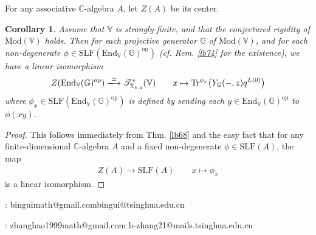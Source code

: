 \documentclass[11pt,b5paper,notitlepage]{article}
\theoremstyle{definition}
\theoremstyle{plain}
\newtheorem{co}[df]{Corollary}
\newcommand{\fk}{\mathfrak}
\newcommand{\Tr}{\mathrm{Tr}}
\newcommand{\End}{\mathrm{End}} %
\newcommand{\opp}{\mathrm{op}}
\newcommand{\SLF}{\mathrm{SLF}}
\newcommand{\Vbb}{\mathbb V}
\newcommand{\Gbb}{\mathbb G}
\newcommand{\Cbb}{\mathbb C}
\newcommand{\<}{\left\langle}
\renewcommand{\>}{\right\rangle}
\newcommand{\ST}{\mathscr{T}}
\newcommand{\Mod}{\mathrm{Mod}}
\numberwithin{equation}{section}
\begin{document}
For any associative $\Cbb$-algebra $A$, let $Z(A)$ be its center.

\begin{co}
Assume that $\Vbb$ is strongly-finite, and that the conjectured rigidity of $\Mod(\Vbb)$ holds. Then for each projective generator $\Gbb$ of $\Mod(\Vbb)$, and for each non-degenerate $\phi\in\SLF(\End_\Vbb(\Gbb)^\opp)$ (cf. Rem. \ref{lb74} for the existence), we have a linear isomorphism
\begin{align}
Z(\End_\Vbb(\Gbb)^\opp)\xlongrightarrow{\simeq} \ST_{\fk T_{z,q}}^*(\Vbb)\qquad x\mapsto \Tr^{\phi_x}\big(Y_\Gbb(-,z)q^{L(0)}\big)
\end{align}
where $\phi_x\in\SLF(\End_\Vbb(\Gbb)^\opp)$ is defined by sending each $y\in\End_\Vbb(\Gbb)^\opp$ to $\phi(xy)$.
\end{co}


\begin{proof}
This follows immediately from Thm. \ref{lb68} and the easy fact that for any finite-dimensional $\Cbb$-algebra $A$ and a fixed non-degenerate $\phi\in\SLF(A)$, the map
\begin{align*}
Z(A)\rightarrow\SLF(A)\qquad x\mapsto\phi_x
\end{align*}
is a linear isomorphism.
\end{proof}

































\footnotesize
	
    


: binguimath@gmail.com\qquad bingui@tsinghua.edu.cn\\


: zhanghao1999math@gmail.com \qquad h-zhang21@mails.tsinghua.edu.cn
\end{document}
